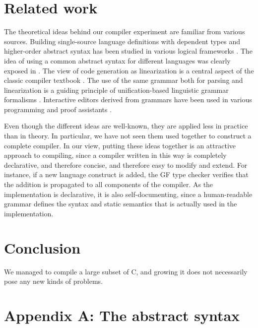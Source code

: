 \documentclass[12pt]{article}
\begin{document}
\section{Related work}

The theoretical ideas behind our compiler experiment
are familiar from various sources.
Building single-source language definitions with
dependent types and higher-order abstract syntax
has been studied in various logical frameworks 
\cite{harper-honsell,magnusson-nordstr,twelf}.
The idea of using a common abstract syntax for different 
languages was clearly exposed in \cite{landin}. The view of
code generation as linearization is a central aspect of
the classic compiler textbook \cite{aho-ullman}. The use
of the same grammar both for parsing and linearization
is a guiding principle of unification-based linguistic grammar 
formalisms \cite{pereira}. Interactive editors derived from
grammars have been used in various programming and proof
assistants \cite{teitelbaum,metal,ALF}.

Even though the different ideas are well-known, they are
applied less in practice than in theory. In particular,
we have not seen them used together to construct a complete
compiler. In our view, putting these ideas together is
an attractive approach to compiling, since a compiler written
in this way is completely declarative, and therefore concise, 
and therefore easy to modify and extend. For instance, if
a new language construct is added, the GF type checker
verifies that the addition is propagated to all components
of the compiler. As the implementation is declarative, 
it is also self-documenting, since a human-readable 
grammar defines the syntax and static
semantics that is actually used in the implementation.


\section{Conclusion}

We managed to compile a large subset of C, and growing it
does not necessarily pose any new kinds of problems. 







\newpage
\section*{Appendix A: The abstract syntax}
\end{document}
